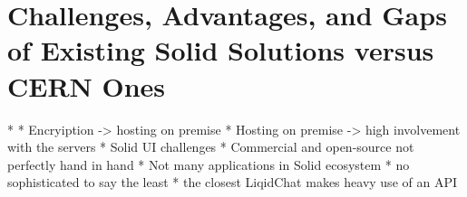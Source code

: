 \section{Challenges, Advantages, and Gaps of Existing Solid Solutions versus CERN Ones}



* 
* Encryiption -> hosting on premise
* Hosting on premise -> high involvement with the servers
* Solid UI challenges
* Commercial and open-source not perfectly hand in hand
* Not many applications in Solid ecosystem
    * no sophisticated to say the least
    * the closest LiqidChat makes heavy use of an API